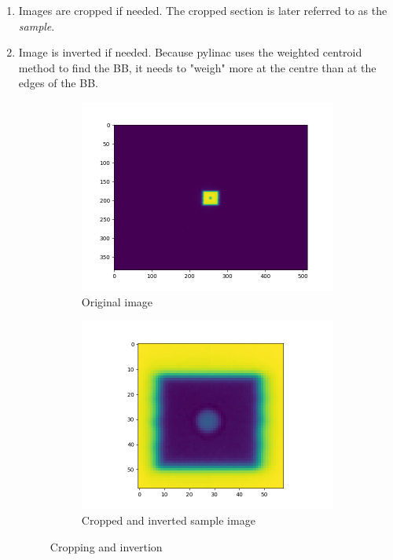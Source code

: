 \begin{enumerate}
   
    \item Images are cropped if needed. The cropped section is later referred to as the \emph{sample}.
    
    \item Image is inverted if needed. Because pylinac uses the weighted centroid method to find the BB, it needs to "weigh" more at the centre than at the edges of the BB.

    \begin{figure}[H]
        \centering
        \begin{subfigure}[b]{0.49\textwidth}
            \includegraphics[width=\textwidth]{Content/Images/bb_find_algo_cropped_original.png}
            \caption{Original image}
        \end{subfigure}
        \begin{subfigure}[b]{0.49\textwidth}
            \includegraphics[width=\textwidth]{Content/Images/bb_find_algo_cropped_inverted.png}
            \caption{Cropped and inverted sample image}
        \end{subfigure}
        \caption{Cropping and invertion \cite{pylinac_images}}
    \end{figure}


\end{enumerate}
